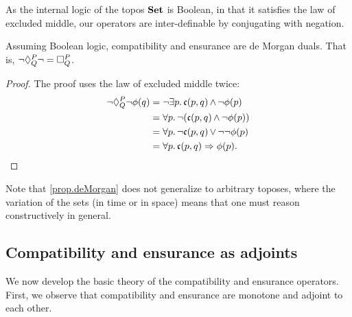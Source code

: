  
    As the internal logic of the topos $\Set$ is Boolean, in that it satisfies the law of excluded middle, our operators are inter-definable by conjugating with negation. 
    
    \begin{prop}\label{prop.deMorgan}
    Assuming Boolean logic, compatibility and ensurance are de Morgan duals. That is, $\neg \compat{P}{Q} \neg = \ensure{P}{Q}$.
    \end{prop}
    \begin{proof} The proof uses the law of excluded middle twice:
    \begin{align*}
        \neg \compat{P}{Q} \neg \phi(q) &= \neg \exists p.\, \mathfrak{c}(p, q) \meet \neg \phi(p) \\
            &= \forall p.\, \neg (\mathfrak{c}(p, q) \meet \neg \phi(p)) \\
            &= \forall p.\, \neg \mathfrak{c}(p, q) \join \neg\neg \phi(p) \\
            &= \forall p.\, \mathfrak{c}(p, q) \Rightarrow \phi(p). \qedhere
    \end{align*}
    \end{proof}
    Note that \cref{prop.deMorgan} does not generalize to arbitrary toposes, where the variation of the sets (in time or in space) means that one must reason constructively in general.
    
\subsection{Compatibility and ensurance as adjoints}
We now develop the basic theory of the compatibility and ensurance operators. First, we observe that compatibility and ensurance are monotone and adjoint to each other.   
    
